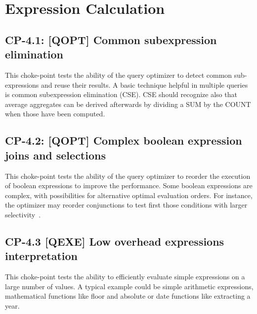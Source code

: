 %


\section{Expression Calculation}

\subsection*{CP-4.1: [QOPT] Common subexpression elimination}
\label{choke_point_4.1}


This choke-point tests the ability of the query optimizer to detect common sub-expressions and reuse their results. A basic technique helpful in multiple queries is common subexpression elimination (CSE).
CSE should recognize also that average aggregates can be derived afterwards by dividing a SUM by the COUNT when those have been computed.



\subsection*{CP-4.2: [QOPT] Complex boolean expression joins and selections}
\label{choke_point_4.2}


This choke-point tests the ability of the query optimizer to reorder the execution of boolean expressions to improve the performance. Some boolean expressions are complex, with possibilities for alternative optimal evaluation orders.
For instance, the optimizer may reorder conjunctions to test first those conditions with larger selectivity~\cite{DBLP:conf/vldb/Moerkotte98}.



\subsection*{CP-4.3 [QEXE] Low overhead expressions interpretation}
\label{choke_point_4.3}
This choke-point tests the ability to efficiently evaluate simple expressions on a large number of values. A typical example could be simple arithmetic expressions, mathematical functions like floor and absolute or date functions like extracting a year.

